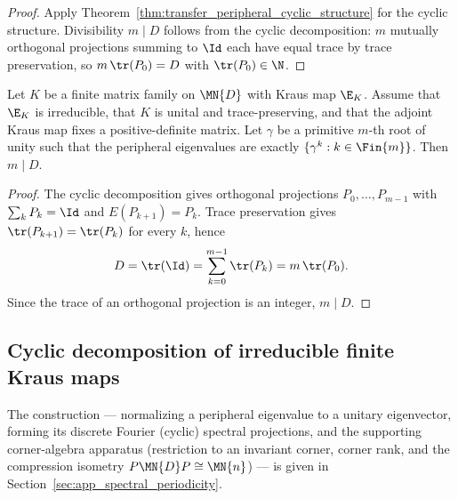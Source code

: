 \begin{proof}
    \leanok
    Apply Theorem~\ref{thm:transfer_peripheral_cyclic_structure} for the cyclic
    structure. Divisibility $m\mid D$ follows from the cyclic
    decomposition: $m$ mutually orthogonal projections summing to $\Id$
    each have equal trace by trace preservation, so
    $m\,\tr(P_0)=D$ with $\tr(P_0)\in\N$.
\end{proof}

\begin{theorem}%
    \label{thm:channel_period_divides_dim}
    \leanok
    Let $K$ be a finite matrix family on $\MN{D}$ with Kraus map $\E_K$.
    Assume that $\E_K$ is irreducible, that $K$ is unital and trace-preserving,
    and that the adjoint Kraus map fixes a positive-definite matrix. Let
    $\gamma$ be a primitive $m$-th root of unity such that the peripheral eigenvalues
    are exactly $\{\gamma^k:k\in\Fin{m}\}$.
    Then $m\mid D$.
\end{theorem}

\begin{proof}
    \leanok
    The cyclic decomposition gives orthogonal projections
    $P_0,\ldots,P_{m-1}$ with $\sum_kP_k=\Id$ and
    $E(P_{k+1})=P_k$. Trace preservation gives
    $\tr(P_{k+1})=\tr(P_k)$ for every $k$, hence
    \begin{align}
        D=\tr(\Id)=\sum_{k=0}^{m-1}\tr(P_k)=m\,\tr(P_0).
        \notag
    \end{align}
    Since the trace of an orthogonal projection is an integer, $m\mid D$.
\end{proof}

\subsection{Cyclic decomposition of irreducible finite Kraus maps}

The construction --- normalizing a peripheral eigenvalue to a unitary
eigenvector, forming its discrete Fourier (cyclic) spectral projections,
and the supporting corner-algebra apparatus (restriction to an invariant
corner, corner rank, and the compression isometry
$P\MN{D}P\cong\MN{n}$) --- is given in
Section~\ref{sec:app_spectral_periodicity}.

